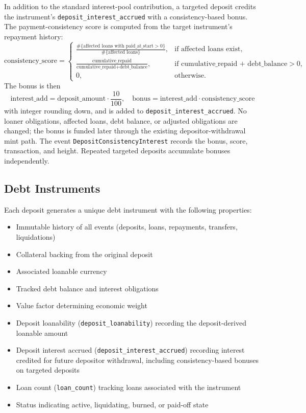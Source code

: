 \documentclass[11pt,a4paper]{article}
\begin{document}
In addition to the standard interest-pool contribution, a targeted deposit credits the instrument's \texttt{deposit\_interest\_accrued} with a consistency-based bonus. The payment-consistency score is computed from the target instrument's repayment history:
\begin{equation}
\text{consistency\_score} =
\begin{cases}
\frac{\#\{\text{affected loans with paid\_at\_start} > 0\}}{\#\{\text{affected loans}\}}, & \text{if affected loans exist},\\
\frac{\text{cumulative\_repaid}}{\text{cumulative\_repaid} + \text{debt\_balance}}, & \text{if cumulative\_repaid + debt\_balance} > 0,\\
0, & \text{otherwise}.
\end{cases}
\end{equation}
The bonus is then
\begin{equation}
\text{interest\_add} = \text{deposit\_amount} \cdot \frac{10}{100},\quad
\text{bonus} = \text{interest\_add} \cdot \text{consistency\_score}
\end{equation}
with integer rounding down, and is added to \texttt{deposit\_interest\_accrued}. No loaner obligations, affected loans, debt balance, or adjusted obligations are changed; the bonus is funded later through the existing depositor-withdrawal mint path. The event \texttt{DepositConsistencyInterest} records the bonus, score, transaction, and height. Repeated targeted deposits accumulate bonuses independently.

\subsection{Debt Instruments}
Each deposit generates a unique debt instrument with the following properties:
\begin{itemize}
\item Immutable history of all events (deposits, loans, repayments, transfers, liquidations)
\item Collateral backing from the original deposit
\item Associated loanable currency
\item Tracked debt balance and interest obligations
\item Value factor determining economic weight
\item Deposit loanability (\texttt{deposit\_loanability}) recording the deposit-derived loanable amount
\item Deposit interest accrued (\texttt{deposit\_interest\_accrued}) recording interest credited for future depositor withdrawal, including consistency-based bonuses on targeted deposits
\item Loan count (\texttt{loan\_count}) tracking loans associated with the instrument
\item Status indicating active, liquidating, burned, or paid-off state
\end{itemize}
\end{document}
